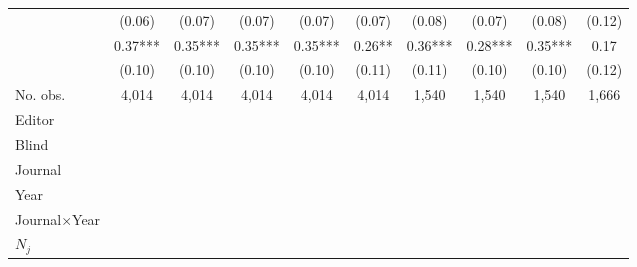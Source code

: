 \begin{table}
\begin{threeparttable}
\begin{tabular}{p{3cm}S@{}S@{}S@{}S@{}S@{}S@{}S@{}S@{}S@{}}
                                          &      (0.06)   &      (0.07)   &      (0.07)   &      (0.07)   &      (0.07)   &      (0.08)   &      (0.07)   &      (0.08)   &      (0.12)   \\
            &        0.37***&        0.35***&        0.35***&        0.35***&        0.26** &        0.36***&        0.28***&        0.35***&        0.17   \\
                                          &      (0.10)   &      (0.10)   &      (0.10)   &      (0.10)   &      (0.11)   &      (0.11)   &      (0.10)   &      (0.10)   &      (0.12)   \\
            \midrule
            No. obs.                      &       4,014   &       4,014   &       4,014   &       4,014   &       4,014   &       1,540   &       1,540   &       1,540   &       1,666   \\
            \midrule
            Editor                &           {}   &           {}   &           {}   &           {}   &           {}   &           {}   &           {}   &           {}   &           {}   \\
            Blind                         &           {}   &           {}   &           {}   &           {}   &           {}   &           {}   &           {}   &           {}   &           {}   \\
            Journal                       &           {}   &           {}   &               &               &               &               &               &               &               \\
            Year                          &               &           {}   &               &               &               &               &               &               &               \\
            Journal\(\times\)Year                  &               &               &           {}   &           {}   &           {}   &           {}   &           {}   &           {}   &           {}   \\
            \(N_j\)                       &               &               &               &           {}   &           {}   &           {}   &           {}   &           {}   &           {}   \\

\end{tabular}
\end{threeparttable}
\end{table}
